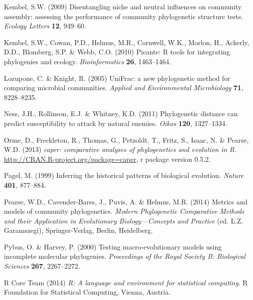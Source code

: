 \documentclass{bioinfo}
\begin{document}
\begin{thebibliography}{30}
Kembel, S.W. (2009) {Disentangling niche and neutral influences on community
  assembly: assessing the performance of community phylogenetic structure
  tests}. \emph{Ecology Letters} \textbf{12}, 949--60.

Kembel, S.W., Cowan, P.D., Helmus, M.R., Cornwell, W.K., Morlon, H., Ackerly,
  D.D., Blomberg, S.P. \& Webb, C.O. (2010) Picante: R tools for integrating
  phylogenies and ecology. \emph{Bioinformatics} \textbf{26}, 1463--1464.

Lozupone, C. \& Knight, R. (2005) {UniFrac}: a new phylogenetic method for
  comparing microbial communities. \emph{Applied and Environmental
  Microbiology} \textbf{71}, 8228--8235.

Ness, J.H., Rollinson, E.J. \& Whitney, K.D. (2011) Phylogenetic distance can
  predict susceptibility to attack by natural enemies. \emph{Oikos}
  \textbf{120}, 1327--1334.

Orme, D., Freckleton, R., Thomas, G., Petzoldt, T., Fritz, S., Isaac, N. \&
  Pearse, W.D. (2013) \emph{caper: comparative analyses of phylogenetics and
  evolution in {R}}. \urlprefix\url{http://CRAN.R-project.org/package=caper}, r
  package version 0.5.2.

Pagel, M. (1999) {Inferring the historical patterns of biological evolution}.
  \emph{Nature} \textbf{401}, 877--884.

Pearse, W.D., Cavender-Bares, J., Puvis, A. \& Helmus, M.R. (2014) Metrics and
  models of community phylogenetics. \emph{Modern Phylogenetic Comparative
  Methods and their Application in Evolutionary Biology---Concepts and
  Practice} (ed. L.Z. Garamszegi), Springer-Verlag, Berlin, Heidelberg.

Pybus, O. \& Harvey, P. (2000) Testing macro-evolutionary models using
  incomplete molecular phylogenies. \emph{Proceedings of the Royal Society B:
  Biological Sciences} \textbf{267}, 2267--2272.

{R Core Team} (2014) \emph{R: A language and environment for statistical
  computing}. R Foundation for Statistical Computing, Vienna, Austria.


\end{thebibliography}
\end{document}
